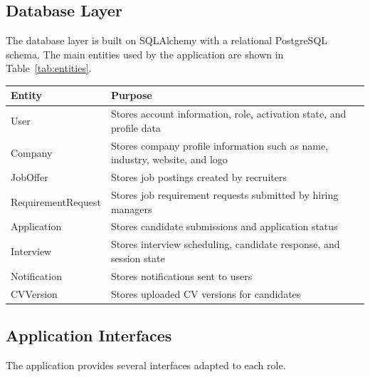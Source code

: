 \subsection{Database Layer}

The database layer is built on SQLAlchemy with a relational PostgreSQL schema. The main entities used by the application are shown in Table~\ref{tab:entities}.

\begin{center}
\label{tab:entities}
\renewcommand{\arraystretch}{1.2}
\begin{tabularx}{\textwidth}{|l|X|}
\hline
\rowcolor{gray!20} \textbf{Entity} & \textbf{Purpose} \\
\hline
User & Stores account information, role, activation state, and profile data \\
\hline
Company & Stores company profile information such as name, industry, website, and logo \\
\hline
JobOffer & Stores job postings created by recruiters \\
\hline
RequirementRequest & Stores job requirement requests submitted by hiring managers \\
\hline
Application & Stores candidate submissions and application status \\
\hline
Interview & Stores interview scheduling, candidate response, and session state \\
\hline
Notification & Stores notifications sent to users \\
\hline
CVVersion & Stores uploaded CV versions for candidates \\
\hline
\end{tabularx}
\end{center}

\subsection{Application Interfaces}

The application provides several interfaces adapted to each role.

